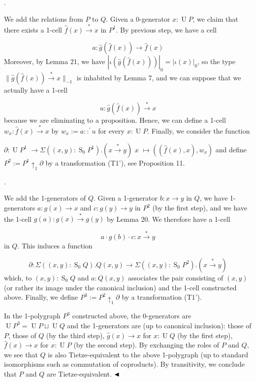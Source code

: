  
 
\par{}. 
 
We add the relations from $P$ to $Q$. Given a 0-generator $x:\operatorname{U}P$, we claim that there exists a 1-cell $\hat{f}(x)\overset{*}{\to}x$ in $P^{1}$. By previous step, we have a cell\par
    \[a:\hat{g}(\hat{f}(x))\to\hat{f}(x)\]    
Moreover, by Lemma 21, we have $|\iota(\hat{g}(\hat{f}(x)))|_{0}=|\iota(x)|_{0}$, so the type $\|\hat{g}(\hat{f}(x))\overset{*}{\to}x\|_{-1}$ is inhabited by Lemma 7, and we can suppose that we actually have a 1-cell\par
    \[u:\hat{g}(\hat{f}(x))\overset{*}{\to}x\]    
because we are eliminating to a proposition. Hence, we can define a 1-cell $w_{x}:\hat{f}(x)\overset{*}{\to}x$ by $w_{x}:=a::^{\prime}u$ for every $x:\operatorname{U}P$. Finally, we consider the function\par
    $\displaystyle\partial:\operatorname{U}P^{1}$ $\displaystyle\to\Sigma((x,y):\operatorname{S}_{0}P^{1}).(x\overset{*}{\to}y)$     $\displaystyle x$ $\displaystyle\mapsto((\hat{f}(x),x),w_{x})$    
and define $P^{2}:=P^{1}{\uparrow_{1}}\partial$ by a transformation (T1’), see Proposition 11.\par
 
 
 
\par{}. 
 
We add the 1-generators of $Q$. Given a 1-generator $b:x\to y$ in $Q$, we have 1-generators $a:g(x)\to x$ and $c:g(y)\to y$ in $P^{2}$ (by the first step), and we have the 1-cell $g(a):g(x)\overset{*}{\to}g(y)$ by Lemma 20. We therefore have a 1-cell\par
    \[a\cdot{}g(b)\cdot{}c:x\overset{*}{\to}y\]    
in $Q$. This induces a function\par
    \[\partial:\Sigma((x,y):\operatorname{S}_{0}Q).Q(x,y)\to\Sigma((x,y):\operatorname{S}_{0}P^{2}).(x\overset{*}{\to}y)\]    
which, to $(x,y):\operatorname{S}_{0}Q$ and $a:Q(x,y)$ associates the pair consisting of $(x,y)$ (or rather its image under the canonical inclusion) and the 1-cell constructed above. Finally, we define $P^{3}:=P^{2}{\uparrow_{1}}\partial$ by a transformation (T1’).\par
 
 
  
In the 1-polygraph $P^{3}$ constructed above, the 0-generators are $\operatorname{U}P^{3}=\operatorname{U}P\sqcup\operatorname{U}Q$ and the 1-generators are (up to canonical inclusion): those of $P$, those of $Q$ (by the third step), $\hat{g}(x)\to x$ for $x:\operatorname{U}Q$ (by the first step), $\hat{f}(x)\to x$ for $x:\operatorname{U}P$ (by the second step). By exchanging the roles of $P$ and $Q$, we see that $Q$ is also Tietze-equivalent to the above 1-polygraph (up to standard isomorphisms such as commutation of coproducts). By transitivity, we conclude that $P$ and $Q$ are Tietze-equivalent. $\hfill\blacktriangleleft$\par
 
